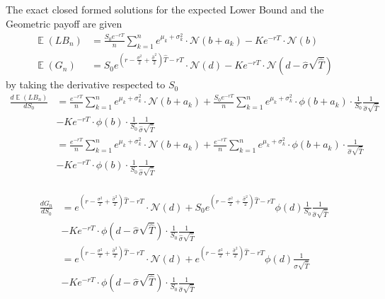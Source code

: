 \documentclass[10pt,oneside,a4paper]{article}
\DeclareMathOperator{\E}{\mathbb{E}}
\begin{document}
\begin{flushleft}
\subsection{}
The exact closed formed solutions for the expected Lower Bound and the Geometric payoff are given
\begin{align*}
\E\left(LB_n\right) &= \frac{S_0 e^{-rT}}{n}\sum_{k=1}^{n} e^{\mu_k + \sigma_k^2} \cdot \mathcal{N}\left(b+a_k\right)  - K e^{-rT} \cdot \mathcal{N}\left(b \right)\\
\E\left(G_n\right) &= S_0 e^{\left(r - \frac{\sigma^2}{2} + \frac{\hat{\sigma}^2}{2}\right)\hat{T} - rT} \cdot \mathcal{N}\left(d\right) - K e^{-rT} \cdot \mathcal{N}\left(d - \hat{\sigma}\sqrt{\hat{T}}\right)
\end{align*}
by taking the derivative respected to $S_0$
\begin{align*}
\frac{d \E\left(LB_n\right)}{dS_0} &= \frac{e^{-rT}}{n}\sum_{k=1}^{n} e^{\mu_k + \sigma_k^2} \cdot \mathcal{N}\left(b+a_k\right) + \frac{S_0 e^{-rT}}{n}\sum_{k=1}^{n}e^{\mu_k + \sigma_k^2} \cdot \phi\left(b+a_k\right) \cdot \frac{1}{S_0}\frac{1}{\hat{\sigma}\sqrt{\hat{T}}}\\
& - K e^{-rT} \cdot \phi\left(b \right) \cdot \frac{1}{S_0}\frac{1}{\hat{\sigma}\sqrt{\hat{T}}}\\
 &= \frac{e^{-rT}}{n}\sum_{k=1}^{n} e^{\mu_k + \sigma_k^2} \cdot \mathcal{N}\left(b+a_k\right) + \frac{e^{-rT}}{n}\sum_{k=1}^{n}e^{\mu_k + \sigma_k^2} \cdot \phi\left(b+a_k\right) \cdot \frac{1}{\hat{\sigma}\sqrt{\hat{T}}}\\
& - K e^{-rT} \cdot \phi\left(b \right) \cdot \frac{1}{S_0}\frac{1}{\hat{\sigma}\sqrt{\hat{T}}}\\
\end{align*} 

\vspace{5mm}
\begin{align*}
\frac{d G_n}{dS_0} &= e^{\left(r - \frac{\sigma^2}{2} + \frac{\hat{\sigma}^2}{2}\right)\hat{T} - rT} \cdot \mathcal{N}\left(d\right) + S_0 e^{\left(r - \frac{\sigma^2}{2} + \frac{\hat{\sigma}^2}{2}\right)\hat{T} - rT} \phi \left(d\right) \frac{1}{S_0} \frac{1}{\hat{\sigma}\sqrt{\hat{T}}}\\
& - K e^{-rT} \cdot \phi\left(d - \hat{\sigma}\sqrt{\hat{T}}\right) \cdot \frac{1}{S_0}\frac{1}{\hat{\sigma}\sqrt{\hat{T}}}\\
&= e^{\left(r - \frac{\sigma^2}{2} + \frac{\hat{\sigma}^2}{2}\right)\hat{T} - rT} \cdot \mathcal{N}\left(d\right) +e^{\left(r - \frac{\sigma^2}{2} + \frac{\hat{\sigma}^2}{2}\right)\hat{T} - rT} \phi \left(d\right) \frac{1}{\hat{\sigma}\sqrt{\hat{T}}}\\
& - K e^{-rT} \cdot \phi\left(d - \hat{\sigma}\sqrt{\hat{T}}\right) \cdot \frac{1}{S_0}\frac{1}{\hat{\sigma}\sqrt{\hat{T}}}\\
\end{align*}


\end{flushleft}
\end{document}
